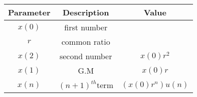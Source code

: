  \begin{tabular}{|c|c|c|}
        \hline
        \textbf{Parameter} & \textbf{Description} &\textbf{Value}\\
        \hline
        $x(0)$ & first number& \\
         \hline
        $r$ & common ratio &\\
        \hline
        $x(2)$ & second number & $x(0)r^2$\\
        \hline
        $x(1)$ & G.M & $x(0)r$\\
        \hline
        $x(n)$ & $(n + 1)^{th}$term & $(x(0)r^n)u(n)$\\
        \hline
    \end{tabular}
 
